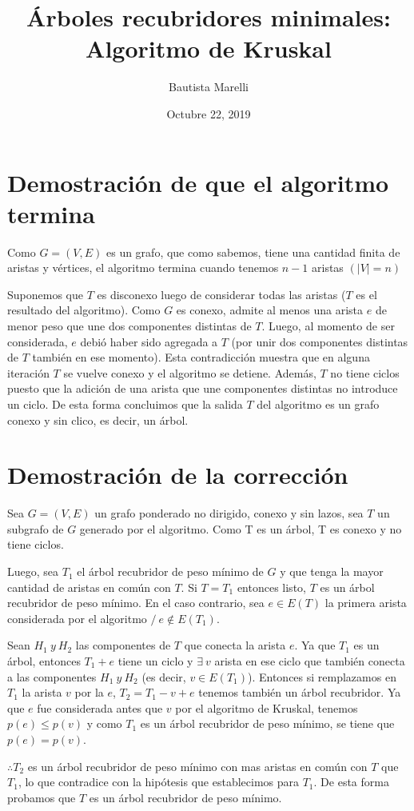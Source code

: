 \documentclass[12pt]{article}
\begin{document}
    
\title{Árboles recubridores minimales: Algoritmo de Kruskal}
\author{Bautista Marelli}
\date{Octubre 22, 2019}
\maketitle
\section{Demostración de que el algoritmo termina}
Como $G = (V,E)$ es un grafo, que como sabemos, tiene una cantidad finita de aristas y vértices, el 
algoritmo termina cuando tenemos $n - 1$ aristas $(|V| = n)$

Suponemos que $T$ es disconexo luego de considerar todas las aristas ($T$ es el resultado del algoritmo). Como $G$ es conexo,
admite al menos una arista $e$ de menor peso que une dos componentes distintas de $T$. Luego, al momento de ser considerada, $e$ debió haber 
sido agregada a $T$ (por unir dos componentes distintas de $T$ también en ese momento). Esta contradicción muestra que en alguna iteración $T$ se vuelve conexo y el
algoritmo se detiene. Además, $T$ no tiene ciclos puesto que la adición de una arista que une componentes distintas no introduce
un ciclo. De esta forma concluimos que la salida $T$ del algoritmo es un grafo conexo y sin clico, es decir, un árbol.


\section{Demostración de la corrección}
Sea $G = (V,E)$ un grafo ponderado no dirigido, conexo y sin lazos, sea $T$ un subgrafo de $G$ 
generado por el algoritmo. Como T es un árbol, T es conexo y no tiene ciclos.

Luego, sea $T_1$ el árbol recubridor de peso mínimo de $G$ y que tenga la mayor cantidad de aristas
en común con $T$. Si $T = T_1$ entonces listo, $T$ es un árbol recubridor de peso mínimo. 
En el caso contrario, sea $e \in E(T)$ la primera arista considerada por el algoritmo $/ \ e \notin E(T_1)$.

Sean $H_1 \ y \ H_2$ las componentes de $T$ que conecta la arista $e$. Ya que $T_1$ es un árbol, entonces $T_1 + e$ tiene
un ciclo y $\exists \ v$ arista en ese ciclo que también conecta a las componentes $H_1 \ y \ H_2$ (es decir, $v \in E(T_1)$). Entonces si remplazamos en $T_1$ 
la arista $v$ por la $e$, $T_2 = T_1 - v + e$ tenemos también un árbol recubridor. Ya que $e$ fue considerada antes que $v$ por el 
algoritmo de Kruskal, tenemos $p(e) \leq p(v)$ y como $T_1$ es un árbol recubridor de peso mínimo, se tiene que $p(e) = p(v)$.

$\therefore T_2$ es un árbol recubridor de peso mínimo con mas aristas en común con $T$ que $T_1$, lo que contradice con la hipótesis que
establecimos para $T_1$. De esta forma probamos que $T$ es un árbol recubridor de peso mínimo.
\end{document}
